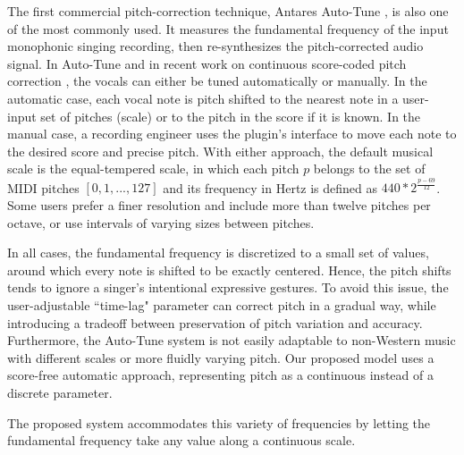 The first commercial pitch-correction technique, Antares Auto-Tune \cite{antares:2016}, is also one of the most commonly used. It measures the fundamental frequency of the input monophonic singing recording, then re-synthesizes the pitch-corrected audio signal. In Auto-Tune and in recent work on continuous score-coded pitch correction \cite{salazar2015continuous}, the vocals can either be tuned automatically or manually. In the automatic case, each vocal note is pitch shifted to the nearest note in a user-input set of pitches (scale) or to the pitch in the score if it is known. In the manual case, a recording engineer uses the plugin's interface to move each note to the desired score and precise pitch. With either approach, the default musical scale is the equal-tempered scale, in which each pitch $p$ belongs to the set of MIDI pitches $[0, 1, ..., 127]$ and its frequency in Hertz is defined as $440*2^{\frac{p-69}{12}}$. Some users prefer a finer resolution and include more than twelve pitches per octave, or use intervals of varying sizes between pitches. 

In all cases, the fundamental frequency is discretized to a small set of values, around which every note is shifted to be exactly centered. Hence, the pitch shifts tends to ignore a singer's intentional expressive gestures. To avoid this issue, the user-adjustable ``time-lag" parameter can correct pitch in a gradual way, while introducing a tradeoff between preservation of pitch variation and accuracy. Furthermore, the Auto-Tune system is not easily adaptable to non-Western music with different scales or more fluidly varying pitch. Our proposed model uses a score-free automatic approach, representing pitch as a continuous instead of a discrete parameter.

The proposed system accommodates this variety of frequencies by letting the fundamental frequency take any value along a continuous scale. 


